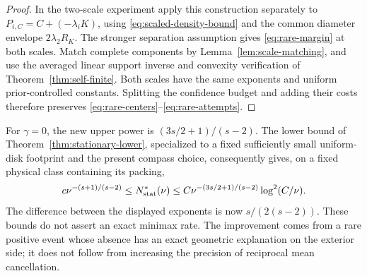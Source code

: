 \begin{proof}
In the two-scale experiment apply this construction separately to
$P_{i,C}=C+(-\lambda_iK)$, using
\eqref{eq:scaled-density-bound} and the common diameter envelope
$2\lambda_2R_K$. The stronger separation assumption gives
\eqref{eq:rare-margin} at both scales. Match complete components by
Lemma~\ref{lem:scale-matching}, and use the averaged linear support
inverse and convexity verification of Theorem~\ref{thm:self-finite}.
Both scales have the same exponents and uniform prior-controlled
constants. Splitting the confidence budget and adding their costs
therefore preserves \eqref{eq:rare-centers}--\eqref{eq:rare-attempts}.
\end{proof}

For $\gamma=0$, the new upper power is $(3s/2+1)/(s-2)$.
The lower bound of Theorem~\ref{thm:stationary-lower}, specialized to
a fixed sufficiently small uniform-disk footprint and the present
compass choice, consequently gives, on a fixed physical class containing
its packing,
\begin{equation}\label{eq:rare-stationary-bracket}
 c\nu^{-(s+1)/(s-2)}
       \le N^*_{\rm stat}(\nu)
       \le C\nu^{-(3s/2+1)/(s-2)}\log^2(C/\nu).
\end{equation}
The difference between the displayed exponents is now
$s/(2(s-2))$. These bounds do not assert an exact minimax rate.
The improvement comes from a rare positive event whose absence has
an exact geometric explanation on the exterior side; it does not
follow from increasing the precision of reciprocal mean cancellation.
